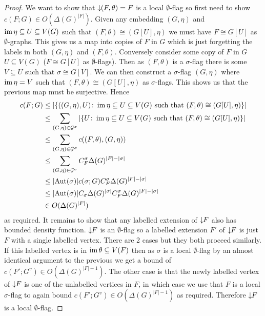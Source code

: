 \begin{proof}
    We want to show that ${\downarrow\!\!(F,\theta)}=F$ is a local $\emptyset$-flag so first need to show
    $c(F; G) \in O(\Delta(G)^{|F|})$.
    Given any embedding $(G,\eta)$ and $\operatorname{im}\eta \subseteq U \subseteq V(G)$ such that
    $(F,\theta) \cong (G[U],\eta)$ we must have $F \cong G[U]$ as $\emptyset$-graphs.
    This gives us a map into copies of $F$ in $G$ which is just forgetting the labels
    in both $(G,\eta)$ and $(F,\theta)$.
    Conversely consider some copy of $F$ in $G$ $U \subseteq V(G)$ ($F \cong G[U]$ as
    $\emptyset$-flags). Then as $(F,\theta)$ is a $\sigma$-flag there is some $V\subseteq U$ such
    that $\sigma \cong G[V]$. We can then construct a $\sigma$-flag $(G,\eta)$ where
    $\operatorname{im}\eta=V$ such that $(F, \theta) \cong (G[U], \eta)$ as $\sigma$-flags.
    This shows us that the previous map must be surjective.
    Hence
    \[
        \begin{split}
            c(F; G)
            &\leq \left|\{ ((G, \eta), U)\colon
                \im\eta \subseteq U \subseteq V(G)\ \text{such that}\ (F,\theta) \cong (G[U],\eta)
                \}\right|\\
            &\leq \sum_{(G,\eta)\in\Gcl^\sigma}
                \left|\{ U\colon
                \im\eta \subseteq U \subseteq V(G)\ \text{such that}\ (F,\theta) \cong (G[U],\eta)
                \}\right|\\
            &\leq \sum_{(G,\eta)\in\Gcl^\sigma} c((F,\theta), (G,\eta))\\
            &\leq \sum_{(G,\eta)\in\Gcl^\sigma} C_F^\sigma\Delta(G)^{|F|-|\sigma|}\\
            &\leq |\mathrm{Aut}(\sigma)|c(\sigma; G) C_F^\sigma\Delta(G)^{|F|-|\sigma|}\\
            &\leq |\mathrm{Aut}(\sigma)|C_\sigma\Delta(G)^{|\sigma|} C_F^\sigma\Delta(G)^{|F|-|\sigma|}\\
            &\in O(\Delta(G)^{|F|})
        \end{split}
    \]
    as required. It remains to show that any labelled extension of ${\downarrow\!\!F}$
    also has bounded density function. ${\downarrow\!\!F}$ is an $\emptyset$-flag so
    a labelled extension $F'$ of ${\downarrow\!\!F}$ is just $F$ with a single labelled vertex.
    There are 2 cases but they both proceed similarly. If this labelled
    vertex is in $\operatorname{im}\theta\subseteq V(F)$ then as $\sigma$ is a local $\emptyset$-flag
    by an almost identical argument to the previous we get a bound of
    $c(F'; G^v) \in O(\Delta(G)^{|F|-1})$. The other case is that the newly labelled
    vertex of ${\downarrow\!\!F}$ is one of the unlabelled vertices in $F$, in which case
    we use that $F$ is a local $\sigma$-flag to again bound
    $c(F'; G^v) \in O(\Delta(G)^{|F|-1})$ as required.
    Therefore ${\downarrow\!\!F}$ is a local $\emptyset$-flag.
\end{proof}

